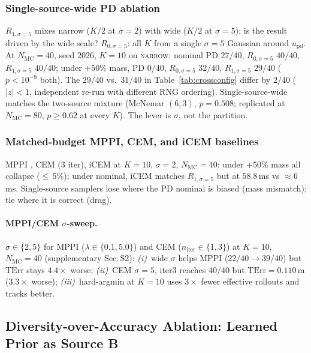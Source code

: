 \documentclass[11pt,onecolumn,a4paper]{article}
\newcommand{\Nm}{N_{\mathrm{MC}}}
\newcommand{\pd}{\mathrm{pd}}
\newcommand{\TErr}{\mathrm{TErr}}
\begin{document}
\subsubsection{Single-source-wide PD ablation}\label{sec:exp-r0-pd-s5}

$R_{1,\sigma=5}$ mixes narrow ($K/2$ at $\sigma = 2$) with wide
($K/2$ at $\sigma = 5$); is the result driven by the wide scale?
$R_{0,\sigma=5}$: all $K$ from a single $\sigma = 5$ Gaussian around
$u_\pd$. At $\Nm = 40$, seed $2026$, $K = 10$ on \textsc{narrow}:
nominal PD $27/40$, $R_{0,\sigma=5}$ $40/40$, $R_{1,\sigma=5}$
$40/40$; under $+50\%$ mass, PD $0/40$, $R_{0,\sigma=5}$ $32/40$,
$R_{1,\sigma=5}$ $29/40$ ($p < 10^{-9}$ both). The $29/40$ vs.\
$31/40$ in Table~\ref{tab:crossconfig} differ by $2/40$ ($|z| < 1$,
independent re-run with different RNG ordering). Single-source-wide
matches the two-source mixture (McNemar $(6, 3)$, $p = 0.508$;
replicated at $\Nm = 80$, $p \ge 0.62$ at every $K$). The lever is
$\sigma$, not the partition.

\subsubsection{Matched-budget MPPI, CEM, and iCEM baselines}\label{sec:exp-mppi-cem}

MPPI \cite{WIL17}, CEM \cite{BOT13} (3 iter), iCEM \cite{PIN20}
at $K = 10$, $\sigma = 2$, $\Nm = 40$: under $+50\%$ mass all
collapse (${\le}\,5\%$); under nominal, iCEM matches $R_{1,\sigma=5}$
but at $58.8\,$ms vs $\approx 6\,$ms. Single-source samplers lose
where the PD nominal is biased (mass mismatch); tie where it is
correct (drag).

\paragraph{MPPI/CEM $\sigma$-sweep.}\label{sec:exp-mppi-sigma-sweep}
$\sigma \in \{2, 5\}$ for MPPI ($\lambda \in \{0.1, 5.0\}$) and CEM
($n_{\mathrm{iter}} \in \{1, 3\}$) at $K = 10$, $\Nm = 40$
(supplementary Sec.\,S2): \emph{(i)}~wide $\sigma$ helps MPPI
($22/40 \to 39/40$) but $\TErr$ stays $4.4\times$ worse;
\emph{(ii)}~CEM $\sigma{=}5$, iter$3$ reaches $40/40$ but
$\TErr = 0.110\,$m ($3.3\times$ worse); \emph{(iii)}~hard-argmin at
$K = 10$ uses $3\times$ fewer effective rollouts and tracks better.

\subsection{Diversity-over-Accuracy Ablation: Learned Prior as Source B}\label{sec:exp-negabl}
\end{document}
